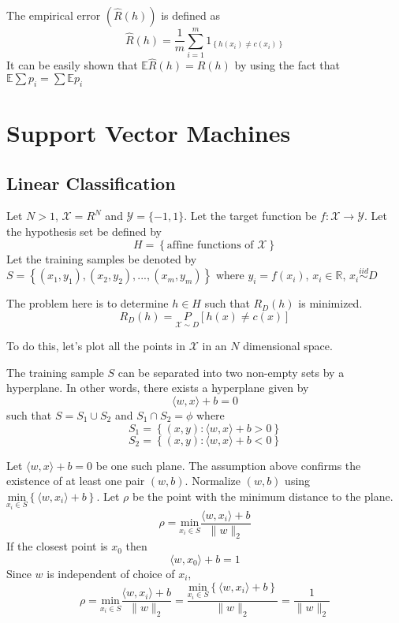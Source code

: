 \documentclass[a4paper,english,12pt]{article}
\begin{document}
\begin{defn}
The empirical error $(\hat{R}(h))$ is defined as
$$ \hat{R}(h) = \frac{1}{m} \sum_{i=1}^m 1_{ \left\{ h(x_i) \neq c(x_i) \right\} }$$
It can be easily shown that $\mathbb{E} \hat{R}(h) = R(h)$ by using the fact that $\mathbb{E} \sum p_i = \sum \mathbb{E} p_i$
\end{defn}

\section{Support Vector Machines}
\subsection{Linear Classification}

\begin{assum}
Let $N>1$, $\mathcal{X} = R^N$ and $\mathcal{Y} = \{-1, 1\}$. Let the target function be $f:\mathcal{X} \rightarrow \mathcal{Y}$. Let the hypothesis set be defined by
$$ H = \left\{ \textrm{affine functions of }\mathcal{X} \right\} $$
Let the training samples be denoted by $S = \left\{ (x_1, y_1), (x_2, y_2), ... , (x_m, y_m) \right\}$ where $ y_i = f(x_i)$, $x_i \in \mathbb{R}$, $x_i \overset{iid} \sim D$

\end{assum}

The problem here is to determine $h \in H$ such that $R_D (h)$ is minimized.
$$ R_D (h) = \underset{\mathcal{X} \sim D} P \left[ h(x) \neq c(x) \right] $$

To do this, let's plot all the points in $\mathcal{X}$ in an $N$ dimensional space.

\begin{assum}
The training sample $S$ can be separated into two non-empty sets by a hyperplane. In other words, there exists a hyperplane given by
$$ \langle w,x \rangle + b = 0 $$
such that $S=S_1 \cup S_2$ and $S_1 \cap S_2 = \phi$ where
$$S_1 = \left\{ (x,y): \langle w,x \rangle +b > 0  \right\}$$
$$S_2 = \left\{ (x,y): \langle w,x \rangle +b < 0  \right\}$$

\end{assum}

Let $\langle w,x \rangle + b = 0$ be one such plane. The assumption above confirms the existence of at least one pair $(w,b)$. Normalize $(w,b)$ using $\underset{x_i \in S} {\mathrm{min}} \left\{ \langle w,x_i \rangle + b \right\}$. Let $\rho$ be the point with the minimum distance to the plane.
$$ \rho = \underset{x_i \in S} {\mathrm{min}} \frac{\langle w,x_i \rangle + b}{\| w \|_2} $$
If the closest point is $x_0$ then
$$ \langle w,x_0 \rangle + b = 1 $$
Since $w$ is independent of choice of $x_i$,
$$ \rho = \underset{x_i \in S} {\mathrm{min}} \frac{\langle w,x_i \rangle + b}{\| w \|_2} = \frac{\underset{x_i \in S} {\mathrm{min}} \left\{\langle w,x_i \rangle + b\right\}}{\| w \|_2} = \frac{1}{\|w\|_2} $$
\end{document}
